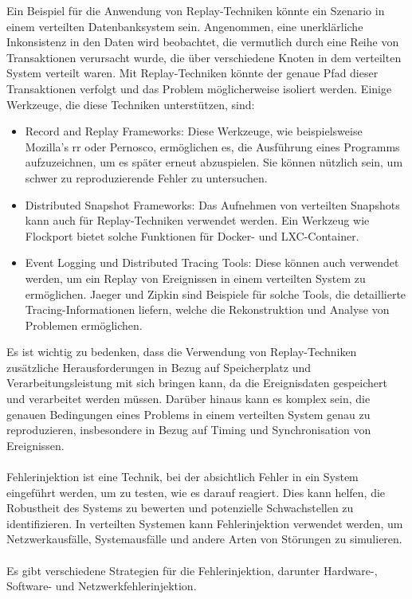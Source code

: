 \documentclass[../vs-script-first-v01.tex]{subfiles}
\begin{document}
Ein Beispiel für die Anwendung von Replay-Techniken könnte ein Szenario in einem verteilten Datenbanksystem sein. Angenommen, eine unerklärliche Inkonsistenz in den Daten wird beobachtet, die vermutlich durch eine Reihe von Transaktionen verursacht wurde, die über verschiedene Knoten in dem verteilten System verteilt waren. Mit Replay-Techniken könnte der genaue Pfad dieser Transaktionen verfolgt und das Problem möglicherweise isoliert werden.
Einige Werkzeuge, die diese Techniken unterstützen, sind:
\begin{itemize}
\item Record and Replay Frameworks: Diese Werkzeuge, wie beispielsweise Mozilla's rr oder Pernosco, ermöglichen es, die Ausführung eines Programms aufzuzeichnen, um es später erneut abzuspielen. Sie können nützlich sein, um schwer zu reproduzierende Fehler zu untersuchen.
\item Distributed Snapshot Frameworks: Das Aufnehmen von verteilten Snapshots kann auch für Replay-Techniken verwendet werden. Ein Werkzeug wie Flockport bietet solche Funktionen für Docker- und LXC-Container.
\item Event Logging und Distributed Tracing Tools: Diese können auch verwendet werden, um ein Replay von Ereignissen in einem verteilten System zu ermöglichen. Jaeger und Zipkin sind Beispiele für solche Tools, die detaillierte Tracing-Informationen liefern, welche die Rekonstruktion und Analyse von Problemen ermöglichen.
\end{itemize}
Es ist wichtig zu bedenken, dass die Verwendung von Replay-Techniken zusätzliche Herausforderungen in Bezug auf Speicherplatz und Verarbeitungsleistung mit sich bringen kann, da die Ereignisdaten gespeichert und verarbeitet werden müssen. Darüber hinaus kann es komplex sein, die genauen Bedingungen eines Problems in einem verteilten System genau zu reproduzieren, insbesondere in Bezug auf Timing und Synchronisation von Ereignissen.
\\\\
Fehlerinjektion ist eine Technik, bei der absichtlich Fehler in ein System eingeführt werden, um zu testen, wie es darauf reagiert. Dies kann helfen, die Robustheit des Systems zu bewerten und potenzielle Schwachstellen zu identifizieren. In verteilten Systemen kann Fehlerinjektion verwendet werden, um Netzwerkausfälle, Systemausfälle und andere Arten von Störungen zu simulieren.
\\\\
Es gibt verschiedene Strategien für die Fehlerinjektion, darunter Hardware-, Software- und Netzwerkfehlerinjektion.
\end{document}
